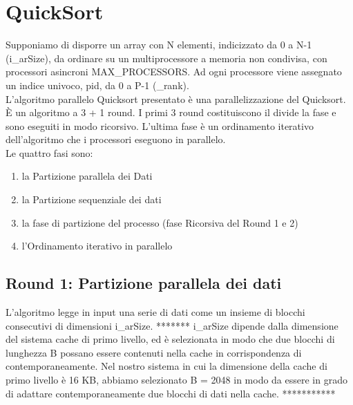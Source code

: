 \chapter{QuickSort}

Supponiamo di disporre un array con N elementi, indicizzato da 0 a N-1 (i\_arSize), da ordinare su un multiprocessore a memoria non condivisa, con processori asincroni MAX\_PROCESSORS. 
Ad ogni processore viene assegnato un indice univoco, pid, da 0 a P-1 (\_rank).\\
L'algoritmo parallelo Quicksort presentato è una parallelizzazione del Quicksort. È un algoritmo a 3 + 1 round. I primi 3 round costituiscono il divide la fase e sono eseguiti in modo ricorsivo. L'ultima fase è un ordinamento iterativo dell'algoritmo che i processori eseguono in parallelo.\\
Le quattro fasi sono:
\begin{enumerate}
\item la Partizione parallela dei Dati 
\item la Partizione sequenziale dei dati
\item la fase di partizione del processo (fase Ricorsiva del Round 1 e 2)
\item l'Ordinamento iterativo in parallelo 
\end{enumerate}
 
\section{Round 1: Partizione parallela dei dati}

L'algoritmo legge in input una serie di dati come un insieme di blocchi consecutivi di dimensioni i\_arSize. 
******* 
i\_arSize dipende dalla dimensione del sistema cache di primo livello, ed è selezionata in modo che due blocchi di lunghezza B possano essere contenuti nella cache in corrispondenza di contemporaneamente. Nel nostro sistema in cui la dimensione della cache di primo livello è 16 KB, abbiamo selezionato
B = 2048 in modo da essere in grado di adattare contemporaneamente due blocchi di dati nella cache. 
***********

